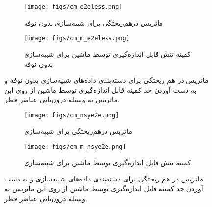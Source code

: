   	\begin{figure}[H]
  		\centering
  		\begin{subfigure}{\textwidth}
  			\centering
  			\texttt{[image: figs/cm\_e2eless.png]}
  			\caption{  ماتریس درهم‌ریختگی برای شبیه‌سازی 
  				بدون نوفه }
  		\end{subfigure}%
  		
  		\begin{subfigure}{0.5\linewidth}
  			\centering
  			\texttt{[image: figs/cm\_m\_e2eless.png]}
  			\caption{  کمینه تنش قابل اندازه‌گیری توسط ماشین برای شبیه‌سازی 
  				بدون نوفه }
  		\end{subfigure}
  		
  		\caption{ماتریس در هم ریختگی برای دسته‌بندی داده‌های شبیه‌سازی
  			بدون نوفه 
  			و به دست آوردن حد کمینه قابل اندازه‌گیری توسط ماشین از روی این ماتریس به وسیله درون‌یابی عناصر قطر.}
  		\label{fig:e2eless_cm}
  	\end{figure}
  	\begin{figure}[H]
  		\centering
  		\begin{subfigure}{\textwidth}
  			\centering
  			\texttt{[image: figs/cm\_nsye2e.png]}
  			\caption{  ماتریس درهم‌ریختگی برای شبیه‌سازی 
  			}
  		\end{subfigure}%
  		
  		\begin{subfigure}{0.5\linewidth}
  			\centering
  			\texttt{[image: figs/cm\_m\_nsye2e.png]}
  			\caption{  کمینه تنش قابل اندازه‌گیری توسط ماشین برای شبیه‌سازی 
  			}
  		\end{subfigure}
  		
  		\caption{ماتریس در هم ریختگی برای دسته‌بندی داده‌های شبیه‌سازی
  			و به دست آوردن حد کمینه قابل اندازه‌گیری توسط ماشین از روی این ماتریس به وسیله درون‌یابی عناصر قطر.
  		}
  		\label{fig:nsye2e_cm}
  	\end{figure}
  	
  	
  	


